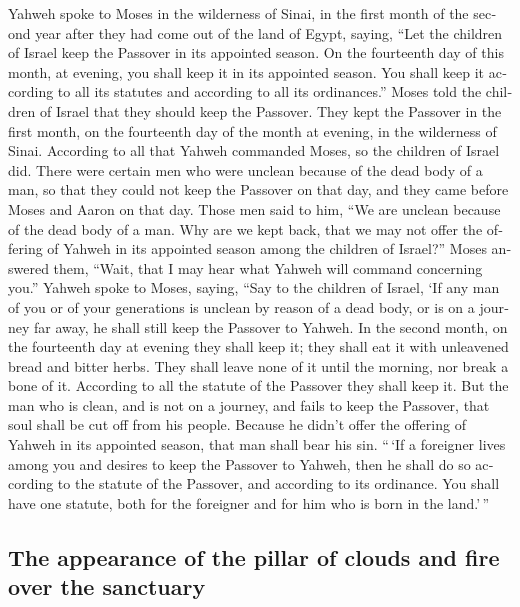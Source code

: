 \begin{paracol}{2}
\begin{otherlanguage}{english}
 Yahweh spoke to Moses in the wilderness of Sinai, in the
first month of the second year after they had come out of the land of
Egypt, saying,  ``Let the children of Israel keep the
Passover in its appointed season.  On the fourteenth day
of this month, at evening, you shall keep it in its appointed season.
You shall keep it according to all its statutes and according to all its
ordinances.''  Moses told the children of Israel that they
should keep the Passover.  They kept the Passover in the
first month, on the fourteenth day of the month at evening, in the
wilderness of Sinai. According to all that Yahweh commanded Moses, so
the children of Israel did.  There were certain men who
were unclean because of the dead body of a man, so that they could not
keep the Passover on that day, and they came before Moses and Aaron on
that day.  Those men said to him, ``We are unclean because
of the dead body of a man. Why are we kept back, that we may not offer
the offering of Yahweh in its appointed season among the children of
Israel?''  Moses answered them, ``Wait, that I may hear
what Yahweh will command concerning you.''  Yahweh spoke
to Moses, saying,  ``Say to the children of Israel, `If
any man of you or of your generations is unclean by reason of a dead
body, or is on a journey far away, he shall still keep the Passover to
Yahweh.  In the second month, on the fourteenth day at
evening they shall keep it; they shall eat it with unleavened bread and
bitter herbs.  They shall leave none of it until the
morning, nor break a bone of it. According to all the statute of the
Passover they shall keep it.  But the man who is clean,
and is not on a journey, and fails to keep the Passover, that soul shall
be cut off from his people. Because he didn't offer the offering of
Yahweh in its appointed season, that man shall bear his sin.
 ``\,`If a foreigner lives among you and desires to keep
the Passover to Yahweh, then he shall do so according to the statute of
the Passover, and according to its ordinance. You shall have one
statute, both for the foreigner and for him who is born in the
land.'\,''

\hypertarget{the-appearance-of-the-pillar-of-clouds-and-fire-over-the-sanctuary}{%
\subsection{The appearance of the pillar of clouds and fire over the
sanctuary}\label{the-appearance-of-the-pillar-of-clouds-and-fire-over-the-sanctuary}}


\end{otherlanguage}
\end{paracol}
